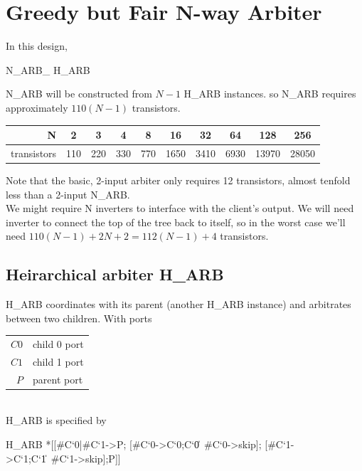 \documentclass{article}
\begin{document}
\section{Greedy but Fair N-way Arbiter}

In this design, 

\begin{csp}
N\_ARB\_ \equiv H\_ARB
\end{csp}

N\_ARB will be constructed from $N-1$ H\_ARB instances. so N\_ARB requires approximately $110(N-1)$ transistors.

\begin{center}
  \begin{tabular}{|r|c|c|c|c|c|c|c|c|c|}
    \hline
    N & 2 & 3 & 4 & 8 & 16 & 32 & 64 & 128 & 256 \\
    \hline
    transistors & 110 & 220 & 330 & 770 & 1650 & 3410 & 6930 & 13970 & 28050 \\
    \hline
  \end{tabular}
\end{center}

Note that the basic, 2-input arbiter only requires 12 transistors, almost tenfold less than a 2-input N\_ARB. \\
We might require N inverters to interface with the client's output. 
We will need inverter to connect the top of the tree back to itself, 
so in the worst case we'll need $110(N-1)+2N+2=112(N-1)+4$ transistors.

\subsection{Heirarchical arbiter H\_ARB}

H\_ARB coordinates with its parent (another H\_ARB instance) and arbitrates between two children. 
With ports

\begin{tabular}[]{rl}
$C0$ & child 0 port \\
$C1$ & child 1 port \\
$P$ & parent port \\
\end{tabular} \\

\noindent H\_ARB is specified by

\begin{csp}
H_ARB\equiv
  *[[#{C`0}|#{C`1}->P;
    [#{C`0}->C`0;C`0\|~#{C`0}->skip];
    [#{C`1}->C`1;C`1\|~#{C`1}->skip];P]]
\end{csp}
\end{document}
